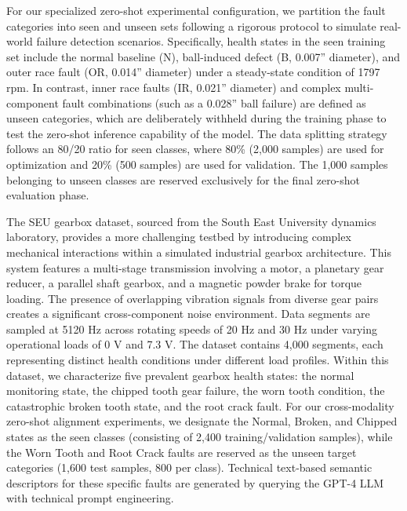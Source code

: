 \documentclass[journal]{IEEEtran}
\begin{document}
For our specialized zero-shot experimental configuration, we partition the fault categories into seen and unseen sets following a rigorous protocol to simulate real-world failure detection scenarios. Specifically, health states in the seen training set include the normal baseline (N), ball-induced defect (B, 0.007'' diameter), and outer race fault (OR, 0.014'' diameter) under a steady-state condition of 1797 rpm. In contrast, inner race faults (IR, 0.021'' diameter) and complex multi-component fault combinations (such as a 0.028'' ball failure) are defined as unseen categories, which are deliberately withheld during the training phase to test the zero-shot inference capability of the model. The data splitting strategy follows an 80/20 ratio for seen classes, where 80\% (2,000 samples) are used for optimization and 20\% (500 samples) are used for validation. The 1,000 samples belonging to unseen classes are reserved exclusively for the final zero-shot evaluation phase.

The SEU gearbox dataset, sourced from the South East University dynamics laboratory, provides a more challenging testbed by introducing complex mechanical interactions within a simulated industrial gearbox architecture. This system features a multi-stage transmission involving a motor, a planetary gear reducer, a parallel shaft gearbox, and a magnetic powder brake for torque loading. The presence of overlapping vibration signals from diverse gear pairs creates a significant cross-component noise environment. Data segments are sampled at 5120 Hz across rotating speeds of 20 Hz and 30 Hz under varying operational loads of 0 V and 7.3 V. The dataset contains 4,000 segments, each representing distinct health conditions under different load profiles. Within this dataset, we characterize five prevalent gearbox health states: the normal monitoring state, the chipped tooth gear failure, the worn tooth condition, the catastrophic broken tooth state, and the root crack fault. For our cross-modality zero-shot alignment experiments, we designate the Normal, Broken, and Chipped states as the seen classes (consisting of 2,400 training/validation samples), while the Worn Tooth and Root Crack faults are reserved as the unseen target categories (1,600 test samples, 800 per class). Technical text-based semantic descriptors for these specific faults are generated by querying the GPT-4 LLM with technical prompt engineering.
\end{document}
